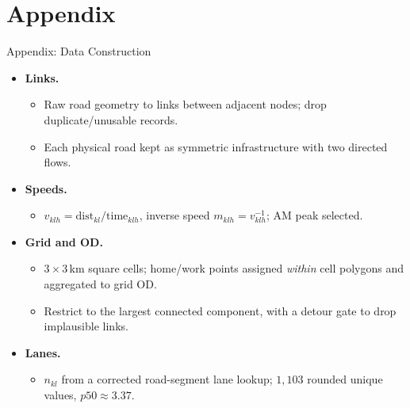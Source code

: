 \documentclass[11pt,aspectratio=169]{beamer}
\newcommand{\navbackfwd}[2]{\par\vspace{0.35em}\noindent\hfill\hyperlink{#1}{\beamerreturnbutton{back}}\;\hyperlink{#2}{\beamergotobutton{details}}}
\begin{document}
\section{Appendix}
\begin{frame}[label=appdata]{Appendix: Data Construction}
\begin{itemize}\small
  \item \textbf{Links.}
  \begin{itemize}\footnotesize
    \item Raw road geometry to links between adjacent nodes; drop duplicate/unusable records.
    \item Each physical road kept as symmetric infrastructure with two directed flows.
  \end{itemize}
  \item \textbf{Speeds.}
  \begin{itemize}\footnotesize
    \item $v_{klh}=\mathrm{dist}_{kl}/\mathrm{time}_{klh}$, inverse speed $m_{klh}=v_{klh}^{-1}$; AM peak selected.
  \end{itemize}
  \item \textbf{Grid and OD.}
  \begin{itemize}\footnotesize
    \item $3\times3$\,km square cells; home/work points assigned \emph{within} cell polygons and aggregated to grid OD.
    \item Restrict to the largest connected component, with a detour gate to drop implausible links.
  \end{itemize}
  \item \textbf{Lanes.}
  \begin{itemize}\footnotesize
    \item $n_{kl}$ from a corrected road-segment lane lookup; $1{,}103$ rounded unique values, $p50\approx3.37$.
  \end{itemize}
\end{itemize}
\navbackfwd{data}{appcost}
\end{frame}
\end{document}
